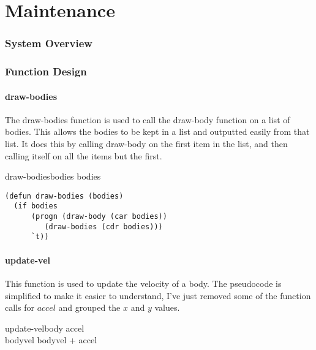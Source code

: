 \part{Maintenance}

\section{System Overview}


\section{Function Design}

\subsection{draw-bodies}
The draw-bodies function is used to call the draw-body function on a list of
bodies. This allows the bodies to be kept in a list and outputted easily from
that list. It does this by calling draw-body on the first item in the list, and
then calling itself on all the items but the first.

\begin{pseudocode}{draw-bodies}{bodies}
	\IF bodies
	  \THEN 
	    \BEGIN
	    	 \\
	    \END
	  \ELSE
      	    \RETURN{\TRUE}	
\end{pseudocode}

\begin{lstlisting}
(defun draw-bodies (bodies)
  (if bodies
      (progn (draw-body (car bodies))
	     (draw-bodies (cdr bodies)))
      `t)) 
\end{lstlisting}

\subsection{update-vel}
This function is used to update the velocity of a body. The pseudocode is
simplified to make it easier to understand, I've just removed some of the
function calls for $accel$ and grouped the $x$ and $y$ values. 

\begin{pseudocode}{update-vel}{body}
	\BEGIN
	accel \GETS {} \\
	bodyvel \GETS bodyvel + accel
	\END
\end{pseudocode}

